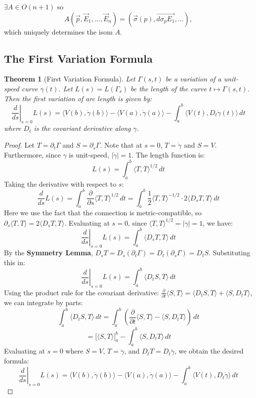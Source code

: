 \documentclass[11pt, a4paper]{article}
\theoremstyle{plain}
\newtheorem{theorem}{Theorem}[section]
\theoremstyle{definition}
\theoremstyle{remark}
\newcommand{\p}{\partial}
\begin{document}
{\noindent
$\exists A \in O(n+1)$ so 
\[ A(\vec{p}, \vec{E}_1, \dots, \vec{E}_n) = (\vec{\sigma}(p), \overrightarrow{d\sigma_p E_1}, \dots), \]
which uniquely determines the isom $A$.

\subsection{The First Variation Formula}

\begin{theorem}[First Variation Formula]
Let $\Gamma(s,t)$ be a variation of a unit-speed curve $\gamma(t)$. Let $L(s) = L(\Gamma_s)$ be the length of the curve $t \mapsto \Gamma(s,t)$. Then the first variation of arc length is given by:
\[ \left. \frac{d}{ds} \right|_{s=0} L(s) = \langle V(b), \dot{\gamma}(b) \rangle - \langle V(a), \dot{\gamma}(a) \rangle - \int_a^b \langle V(t), D_t \dot{\gamma}(t) \rangle \, dt \]
where $D_t$ is the covariant derivative along $\gamma$.
\end{theorem}
\newcommand{\mt}[1]{\langle #1 \rangle}
\begin{proof}
Let $T = \partial_t \Gamma$ and $S = \partial_s \Gamma$. Note that at $s=0$, $T = \dot{\gamma}$ and $S = V$. Furthermore, since $\gamma$ is unit-speed, $|\dot{\gamma}| = 1$.
The length function is:
\[ L(s) = \int_a^b \langle T, T \rangle^{1/2} \, dt \]
Taking the derivative with respect to $s$:
\[ \frac{d}{ds} L(s) = \int_a^b \frac{\partial}{\partial s} \langle T, T \rangle^{1/2} \, dt = \int_a^b \frac{1}{2} \langle T, T \rangle^{-1/2} \cdot 2 \langle D_s T, T \rangle \, dt \]
Here we use the fact that the connection is metric-compatible, so $\p_s\mt{T,T} = 2\mt{D_s T, T}$.
Evaluating at $s=0$, since $\langle T, T \rangle^{1/2} = |\dot{\gamma}| = 1$, we have:
\[ \left. \frac{d}{ds} \right|_{s=0} L(s) = \int_a^b \langle D_s T, T \rangle \, dt \]
By the \textbf{Symmetry Lemma}, $D_s T = D_s (\partial_t \Gamma) = D_t (\partial_s \Gamma) = D_t S$. Substituting this in:
\[ \left. \frac{d}{ds} \right|_{s=0} L(s) = \int_a^b \langle D_t S, T \rangle \, dt \]
Using the product rule for the covariant derivative: $\frac{\partial}{\partial t} \langle S, T \rangle = \langle D_t S, T \rangle + \langle S, D_t T \rangle$, we can integrate by parts:
\[ \int_a^b \langle D_t S, T \rangle \, dt = \int_a^b \left( \frac{\partial}{\partial t} \langle S, T \rangle - \langle S, D_t T \rangle \right) \, dt \]
\[ = \Big[ \langle S, T \rangle \Big]_a^b - \int_a^b \langle S, D_t T \rangle \, dt \]
Evaluating at $s=0$ where $S=V$, $T=\dot{\gamma}$, and $D_t T = D_t \dot{\gamma}$, we obtain the desired formula:
\[ \left. \frac{d}{ds} \right|_{s=0} L(s) = \langle V(b), \dot{\gamma}(b) \rangle - \langle V(a), \dot{\gamma}(a) \rangle - \int_a^b \langle V(t), D_t \dot{\gamma} \rangle \, dt \]
\end{proof}

}
\end{document}
